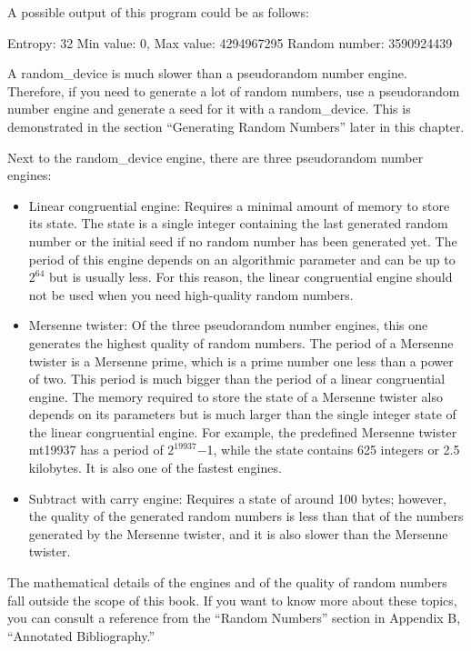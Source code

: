 A possible output of this program could be as follows:

\begin{shell}
Entropy: 32
Min value: 0, Max value: 4294967295
Random number: 3590924439
\end{shell}

A random\_device is much slower than a pseudorandom number engine. Therefore, if you need to generate a lot of random numbers, use a pseudorandom number engine and generate a seed for it with a random\_device. This is demonstrated in the section “Generating Random Numbers” later in this chapter.

Next to the random\_device engine, there are three pseudorandom number engines:

\begin{itemize}
\item
Linear congruential engine: Requires a minimal amount of memory to store its state. The state is a single integer containing the last generated random number or the initial seed if no random number has been generated yet. The period of this engine depends on an algorithmic parameter and can be up to $2^{64}$ but is usually less. For this reason, the linear congruential engine should not be used when you need high-quality random numbers.

\item
Mersenne twister: Of the three pseudorandom number engines, this one generates the highest quality of random numbers. The period of a Mersenne twister is a Mersenne prime, which is a prime number one less than a power of two. This period is much bigger than the period of a linear congruential engine. The memory required to store the state of a Mersenne twister also depends on its parameters but is much larger than the single integer state of the linear congruential engine. For example, the predefined Mersenne twister mt19937 has a period of $2^{19937}$−1, while the state contains 625 integers or 2.5 kilobytes. It is also one of the fastest engines.

\item
Subtract with carry engine: Requires a state of around 100 bytes; however, the quality of the generated random numbers is less than that of the numbers generated by the Mersenne twister, and it is also slower than the Mersenne twister.
\end{itemize}

The mathematical details of the engines and of the quality of random numbers fall outside the scope of this book. If you want to know more about these topics, you can consult a reference from the “Random Numbers” section in Appendix B, “Annotated Bibliography.”

